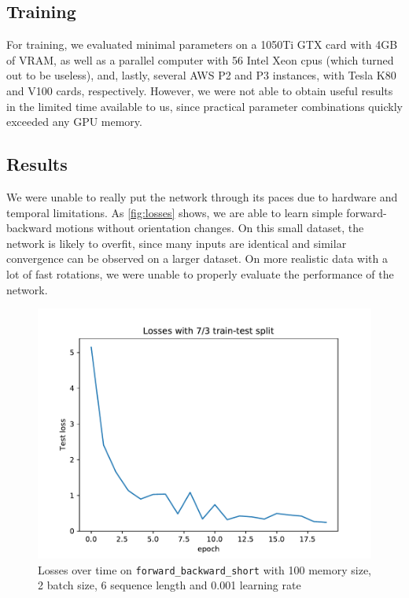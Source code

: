 \documentclass[a4paper,11pt]{article}
\begin{document}
\subsection{Training}
\label{sec:evaluation:training}

For training, we evaluated minimal parameters on a 1050Ti GTX card with 4GB of
VRAM, as well as a parallel computer with 56 Intel Xeon cpus (which turned out
to be useless), and, lastly, several AWS P2 and P3 instances, with Tesla K80 and
V100 cards, respectively. However, we were not able to obtain useful results in
the limited time available to us, since practical parameter combinations quickly
exceeded any GPU memory.


\subsection{Results}
\label{sec:evaluation:results}

We were unable to really put the network through its paces due to hardware and
temporal limitations. As \autoref{fig:losses} shows, we are able to learn simple
forward-backward motions without orientation changes. On this small dataset, the
network is likely to overfit, since many inputs are identical and similar convergence can be
observed on a larger dataset. On more realistic data with a lot of fast
rotations, we were unable to properly evaluate the performance of the network.

\begin{figure}
    \centering
    \includegraphics[width=0.8\linewidth]{losses.pdf}
    \caption{Losses over time on \texttt{forward\_backward\_short} with 100
    memory size, 2 batch size, 6 sequence length and 0.001 learning rate}
    \label{fig:losses}
\end{figure}
\end{document}
